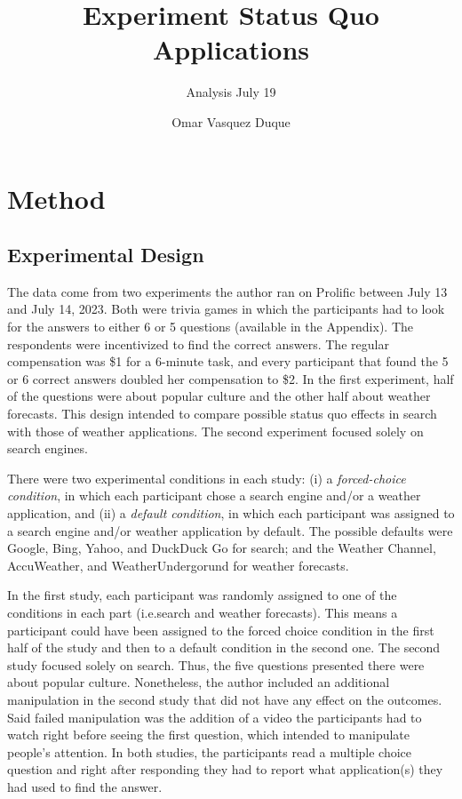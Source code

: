 \documentclass[
  11pt,
]{article}
\title{Experiment Status Quo Applications}
\subtitle{Analysis July 19}
\author{Omar Vasquez Duque}
\date{}
\begin{document}
\maketitle

\hypertarget{method}{%
\section{Method}\label{method}}

\hypertarget{experimental-design}{%
\subsection{Experimental Design}\label{experimental-design}}

The data come from two experiments the author ran on Prolific between July 13 and July 14, 2023. Both were trivia games in which the participants had to look for the answers to either 6 or 5 questions (available in the Appendix). The respondents were incentivized to find the correct answers. The regular compensation was \$1 for a 6-minute task, and every participant that found the 5 or 6 correct answers doubled her compensation to \$2. In the first experiment, half of the questions were about popular culture and the other half about weather forecasts. This design intended to compare possible status quo effects in search with those of weather applications. The second experiment focused solely on search engines.

There were two experimental conditions in each study: (i) a \emph{forced-choice condition}, in which each participant chose a search engine and/or a weather application, and (ii) a \emph{default condition}, in which each participant was assigned to a search engine and/or weather application by default. The possible defaults were Google, Bing, Yahoo, and DuckDuck Go for search; and the Weather Channel, AccuWeather, and WeatherUndergorund for weather forecasts.

In the first study, each participant was randomly assigned to one of the conditions in each part (i.e.search and weather forecasts). This means a participant could have been assigned to the forced choice condition in the first half of the study and then to a default condition in the second one. The second study focused solely on search. Thus, the five questions presented there were about popular culture. Nonetheless, the author included an additional manipulation in the second study that did not have any effect on the outcomes. Said failed manipulation was the addition of a video the participants had to watch right before seeing the first question, which intended to manipulate people's attention. In both studies, the participants read a multiple choice question and right after responding they had to report what application(s) they had used to find the answer.
\end{document}
